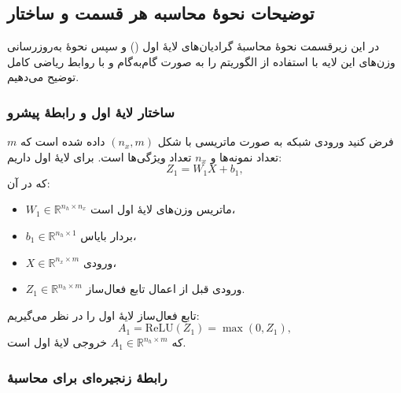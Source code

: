 \documentclass{article}
\begin{document}

\begin{latin}
	
	\begin{LTR}
		\inputminted{python}{CODE/backward_and_adam_update.py}
	\end{LTR}
\end{latin}




\subsection{توضیحات نحوهٔ محاسبه هر قسمت و ساختار }

در این زیر‌قسمت نحوهٔ محاسبهٔ گرادیان‌های لایهٔ اول () و سپس نحوهٔ به‌روزرسانی وزن‌های این لایه با استفاده از الگوریتم  را به صورت گام‌به‌گام و با روابط ریاضی کامل توضیح می‌دهیم.

\subsubsection{ساختار لایهٔ اول و رابطهٔ پیشرو}

فرض کنید ورودی شبکه به صورت ماتریسی با شکل $(n_x, m)$ داده شده است که $m$ تعداد نمونه‌ها و $n_x$ تعداد ویژگی‌ها است. برای لایهٔ اول داریم:
\begin{equation}
	Z_1 = W_1 X + b_1,
\end{equation}
که در آن:
\begin{itemize}
	\item $W_1 \in \mathbb{R}^{n_h \times n_x}$ ماتریس وزن‌های لایهٔ اول است،
	\item $b_1 \in \mathbb{R}^{n_h \times 1}$ بردار بایاس،
	\item $X \in \mathbb{R}^{n_x \times m}$ ورودی،
	\item $Z_1 \in \mathbb{R}^{n_h \times m}$ ورودی قبل از اعمال تابع فعال‌ساز.
\end{itemize}

تابع فعال‌ساز لایهٔ اول را  در نظر می‌گیریم:
\begin{equation}
	A_1 = \mathrm{ReLU}(Z_1) = \max(0, Z_1),
\end{equation}
که $A_1 \in \mathbb{R}^{n_h \times m}$ خروجی لایهٔ اول است.

\subsubsection{رابطهٔ زنجیره‌ای برای محاسبهٔ }
\end{document}
